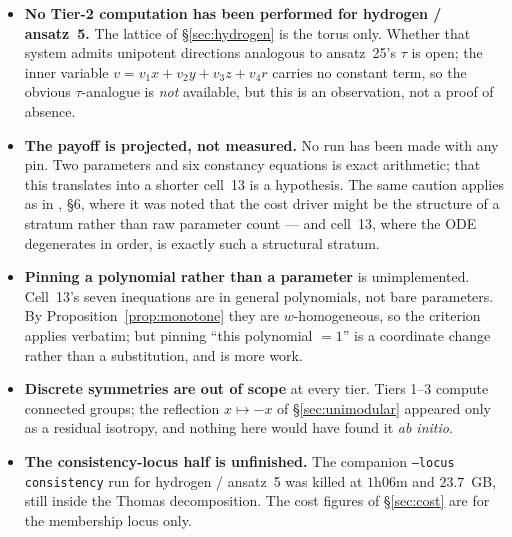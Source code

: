 \documentclass[11pt]{article}
\newcommand{\code}[1]{\texttt{#1}}
\theoremstyle{plain}
\theoremstyle{definition}
\theoremstyle{remark}
\begin{document}
\begin{itemize}
\item \textbf{No Tier-2 computation has been performed for hydrogen /
      ansatz~5.} The lattice of \S\ref{sec:hydrogen} is the torus only. Whether
      that system admits unipotent directions analogous to ansatz~25's $\tau$
      is open; the inner variable $v = v_1x + v_2y + v_3z + v_4r$ carries no
      constant term, so the obvious $\tau$-analogue is \emph{not} available,
      but this is an observation, not a proof of absence.
\item \textbf{The payoff is projected, not measured.} No run has been made with
      any pin. Two parameters and six constancy equations is exact arithmetic;
      that this translates into a shorter cell~13 is a hypothesis. The same
      caution applies as in \cite{ansatz25}, \S6, where it was noted that the
      cost driver might be the structure of a stratum rather than raw parameter
      count --- and cell~13, where the ODE degenerates in order, is exactly
      such a structural stratum.
\item \textbf{Pinning a polynomial rather than a parameter} is unimplemented.
      Cell~13's seven inequations are in general polynomials, not bare
      parameters. By Proposition~\ref{prop:monotone} they are $w$-homogeneous,
      so the criterion applies verbatim; but pinning ``this polynomial $= 1$''
      is a coordinate change rather than a substitution, and is more work.
\item \textbf{Discrete symmetries are out of scope} at every tier. Tiers 1--3
      compute connected groups; the reflection $x \mapsto -x$ of
      \S\ref{sec:unimodular} appeared only as a residual isotropy, and nothing
      here would have found it \emph{ab initio}.
\item \textbf{The consistency-locus half is unfinished.} The companion
      \code{--locus consistency} run for hydrogen / ansatz~5 was killed at
      $1$h$06$m and $23.7$~GB, still inside the Thomas decomposition. The cost
      figures of \S\ref{sec:cost} are for the membership locus only.
\end{itemize}
\end{document}
